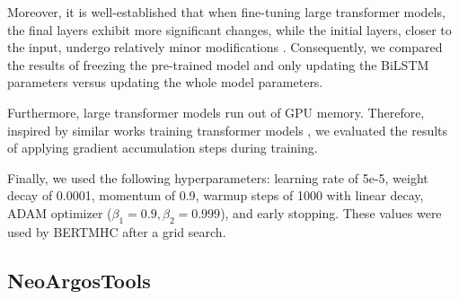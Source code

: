  Moreover, it is well-established that when fine-tuning large transformer models, the final layers exhibit more significant changes, while the initial layers, closer to the input, undergo relatively minor modifications \cite{merchant2020happens,lee2019would,kovaleva2019revealing}. Consequently, we compared the results of freezing the pre-trained model and only updating the BiLSTM parameters versus updating the whole model parameters. 
 
 Furthermore, large transformer models run out of GPU memory. Therefore, inspired by similar works training transformer models \cite{anil2021large,zhang2023adam,huang2023measuring}, we evaluated the results of applying gradient accumulation steps during training.
 
 Finally, we used the following hyperparameters: learning rate of 5e-5, weight decay of 0.0001, momentum of 0.9, warmup steps of 1000 with linear decay, ADAM optimizer ($\beta_1 = 0.9, \beta_2=0.999$), and early stopping. These values were used by BERTMHC \cite{cheng2021bertmhc} after a grid search.

\subsection{NeoArgosTools}